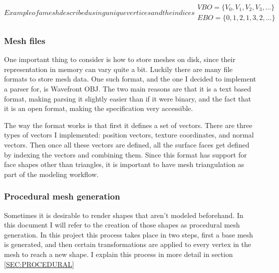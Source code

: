 \begin{equation}[EQ:VBO_EBO]{Example of a mesh described using unique vertices and the indices}
  \boxed{
    \begin{matrix}
      VBO = \{ V_0, V_1, V_2, V_3, \dots \} \\
      EBO = \{ 0, 1, 2, 1, 3, 2, \dots \}
    \end{matrix}
  }
\end{equation}

\subsubsection{Mesh files}


One important thing to consider is how to store meshes on disk,
since their representation in memory can vary quite a bit.
Luckily there are many file formats to store mesh data.
One such format,
and the one I decided to implement a parser for,
is Wavefront OBJ.
The two main reasons are that it is a text based format,
making parsing it slightly easier than if it were binary,
and the fact that it is an open format,
making the specification very accessible.

The way the format works is that first it defines a set of vectors.
There are three types of vectors I implemented:
position vectors, texture coordinates, and normal vectors.
Then once all these vectors are defined,
all the surface faces get defined by indexing the vectors and combining them.
Since this format has support for face shapes other than triangles,
it is important to have mesh triangulation as part of the modeling workflow.

\subsubsection{Procedural mesh generation}



Sometimes it is desirable to render shapes that aren't modeled beforehand.
In this document I will refer to the creation of those shapes as procedural mesh generation.
In this project this process takes place in two steps,
first a base mesh is generated,
and then certain transformations are applied to every vertex in the mesh to reach a new shape.
I explain this process in more detail in section \ref{SEC:PROCEDURAL}
